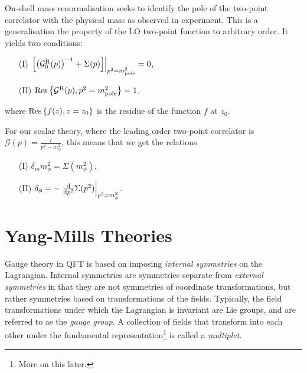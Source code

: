 \documentclass[../main.tex]{subfiles}
\begin{document}
\begin{donotread}
  On-shell mass renormalisation seeks to identify the pole of the two-point
  correlator with the physical mass as observed in experiment. This is a
  generalisation the property of the LO two-point function to arbitrary order. It
  yields two conditions:
  \begin{center}
    \begin{itemize}
      \item [(I)] \(\evalat{\bclosed{\pclosed{\mathcal{G}^\text{R}_0(p)}^{-1}
                + \Sigma(p)}}{p^2 = m_\text{pole}^2} = 0\),
      \item [(II)] \(\operatorname{Res}\cclosed{\mathcal{G}^\text{R}(p), p^2
              = m_\text{pole}^2} = 1\),
    \end{itemize}
  \end{center}
  where \(\operatorname{Res}\cclosed{f(z), z = z_0}\) is the residue of the
  function \(f\) at \(z_0\).
  \medskip

  For our scalar theory, where the leading order two-point correlator is
  \(\mathcal{G}(p) = \frac{i}{p^2 - m_\phi^2}\), this means that we get the
  relations
  \begin{center}
    \begin{itemize}
      \item [(I)] \(\delta_m m_\phi^2 = \Sigma(m_\phi^2)\),
      \item [(II)] \(\delta_\phi = -\evalat{\d[p^2]{}\Sigma(p^2)}{p^2 =
              m_\phi^2}\).
    \end{itemize}
  \end{center}
  \provethis{}


\end{donotread}


\section{Yang-Mills Theories}
\label{qft:sec:yang-mills}

Gauge theory in QFT is based on imposing \emph{internal symmetries} on the
Lagrangian. Internal symmetries are symmetries separate from \emph{external
  symmetries} in that they are not symmetries of coordinate transformations,
but
rather symmetries based on transformations of the fields. Typically, the field
transformations under which the Lagrangian is invariant are Lie groups, and are
referred to as the \emph{gauge group}. A collection of fields that transform
into each other under the fundamental representation\footnote{More on this
  later.} is called a \emph{multiplet}.
\end{document}
